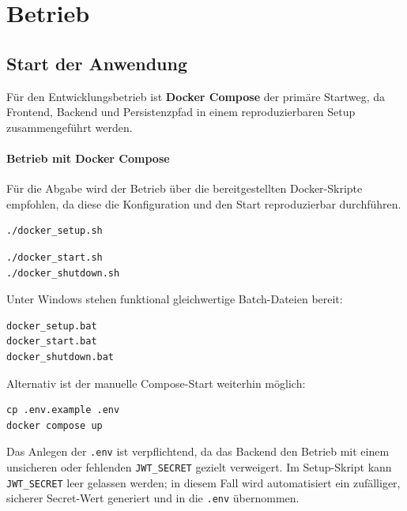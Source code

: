 \section{Betrieb}

\subsection{Start der Anwendung}

Für den Entwicklungsbetrieb ist \textbf{Docker Compose} der primäre
Startweg, da Frontend, Backend und Persistenzpfad in einem reproduzierbaren
Setup zusammengeführt werden.

\paragraph{Betrieb mit Docker Compose}
Für die Abgabe wird der Betrieb über die bereitgestellten Docker-Skripte
empfohlen, da diese die Konfiguration und den Start reproduzierbar durchführen.

\begin{lstlisting}[style=terminal,caption={Erstinitialisierung (Linux/macOS)}]
./docker_setup.sh
\end{lstlisting}

\begin{lstlisting}[style=terminal,caption={Regulaerer Start/Stop (Linux/macOS)}]
./docker_start.sh
./docker_shutdown.sh
\end{lstlisting}

Unter Windows stehen funktional gleichwertige Batch-Dateien bereit:

\begin{lstlisting}[style=terminal,caption={Windows (CMD/PowerShell)}]
docker_setup.bat
docker_start.bat
docker_shutdown.bat
\end{lstlisting}

Alternativ ist der manuelle Compose-Start weiterhin möglich:

\begin{lstlisting}[style=terminal]
cp .env.example .env
docker compose up
\end{lstlisting}

Das Anlegen der \texttt{.env} ist verpflichtend, da das Backend den Betrieb mit
einem unsicheren oder fehlenden \texttt{JWT\_SECRET} gezielt verweigert.
Im Setup-Skript kann \texttt{JWT\_SECRET} leer gelassen werden; in diesem Fall
wird automatisiert ein zufälliger, sicherer Secret-Wert generiert und in die
\texttt{.env} übernommen.

